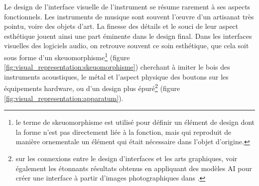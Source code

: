 \noindent Le design de l'interface visuelle de l'instrument se résume rarement à ses aspects fonctionnels. Les instruments de musique sont souvent l'œuvre d'un artisanat très pointu, voire des objets d'art. La finesse des détails et le souci de leur aspect esthétique jouent ainsi une part éminente dans le design final. Dans les interfaces visuelles des logiciels audio, on retrouve souvent ce soin esthétique, que cela soit sous forme d'un skeuomorphisme\footnote{le terme de skeuomorphisme est utilisé pour définir un élément de design dont la forme n'est pas directement liée à la fonction, mais qui reproduit de manière ornementale un élément qui était nécessaire dans l'objet d'origine.} (figure \ref{fig:visual_representation:skeuomorphisme}) cherchant à imiter le bois des instruments acoustiques, le métal et l'aspect physique des boutons sur les équipements hardware, ou d'un design plus épuré\footnote{sur les connexions entre le design d'interfaces et les arts graphiques, voir également les étonnants résultats obtenus en appliquant des modèles AI pour créer une interface à partir d'images photographiques dans \cite{troyer_mondrian_2019}.}  (figure \ref{fig:visual_representation:apparatum}).


